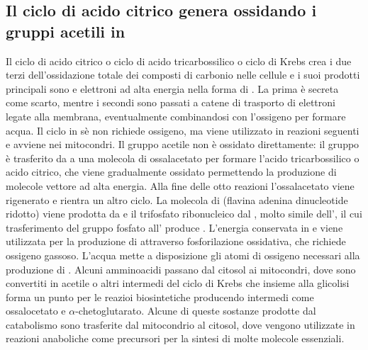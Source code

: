 \subsection{Il ciclo di acido citrico genera  ossidando i gruppi acetili in }
Il ciclo di acido citrico o ciclo di acido tricarbossilico o ciclo di Krebs crea i due terzi dell'ossidazione totale dei composti di carbonio nelle cellule e i suoi prodotti principali
sono  e elettroni ad alta energia nella forma di . La prima \`e secreta come scarto, mentre i secondi sono passati a catene di trasporto di elettroni legate alla 
membrana, eventualmente combinandosi con l'ossigeno per formare acqua. Il ciclo in s\`e non richiede ossigeno, ma viene utilizzato in reazioni seguenti e avviene nei mitocondri. Il 
gruppo acetile non \`e ossidato direttamente: il gruppo \`e trasferito da  a una molecola di ossalacetato per formare l'acido tricarbossilico o acido citrico, che viene
gradualmente ossidato permettendo la produzione di molecole vettore ad alta energia. Alla fine delle otto reazioni l'ossalacetato viene rigenerato e rientra un altro ciclo. La molecola
di  (flavina adenina dinucleotide ridotto) viene prodotta da  e il trifosfato ribonucleico  dal , molto simile dell', il cui trasferimento 
del gruppo fosfato all' produce . L'energia conservata in  e  viene utilizzata per la produzione di  attraverso fosforilazione ossidativa, che
richiede ossigeno gassoso. L'acqua mette a disposizione gli atomi di ossigeno necessari alla produzione di . Alcuni amminoacidi passano dal citosol ai mitocondri, dove sono 
convertiti in acetile  o altri intermedi del ciclo di Krebs che insieme alla glicolisi forma un punto per le reazioi biosintetiche producendo intermedi come ossalocetato e 
$\alpha$-chetoglutarato. Alcune di queste sostanze prodotte dal catabolismo sono trasferite dal mitocondrio al citosol, dove vengono utilizzate in reazioni anaboliche come precursori
per la sintesi di molte molecole essenziali.
